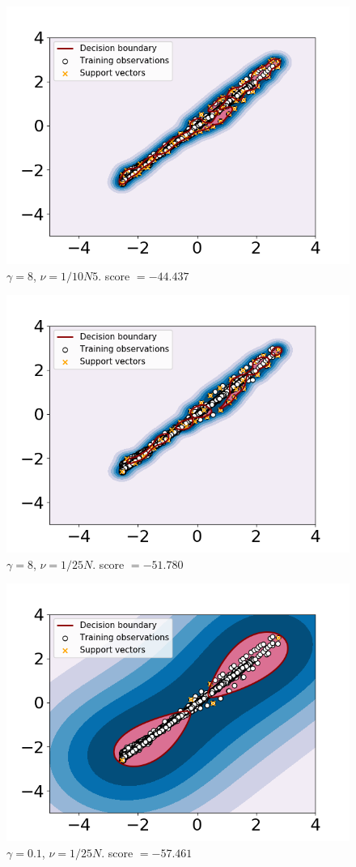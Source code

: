     
    \begin{figure}
        \centering
        \includegraphics[width = .7\textwidth]{report/figures/analysis/gridsearch/Novelty detection, -5 training, gamma = 8 nu = 1.0583130489998942e-05.png}
        \caption{$\gamma = 8$, $\nu = 1/10N5$. score $=-44.437$}
        \label{fig:my_label}
    \end{figure}
    
    \begin{figure}
        \centering
        \includegraphics[width = .7\textwidth]{report/figures/analysis/gridsearch/Novelty detection, -4 training, gamma = 8 nu = 4.233252195999577e-06.png}
        \caption{$\gamma = 8$, $\nu = 1/25N$. score $=-51.780$}
        \label{fig:my_label}
    \end{figure}
    
    \begin{figure}
        \centering
        \includegraphics[width = .7\textwidth]{report/figures/analysis/gridsearch/Novelty detection, -3 training, gamma = 0.1 nu = 4.233252195999577e-06.png}
        \caption{$\gamma = 0.1$, $\nu = 1/25N$. score $=-57.461$}
        \label{fig:my_label}
    \end{figure}
    
